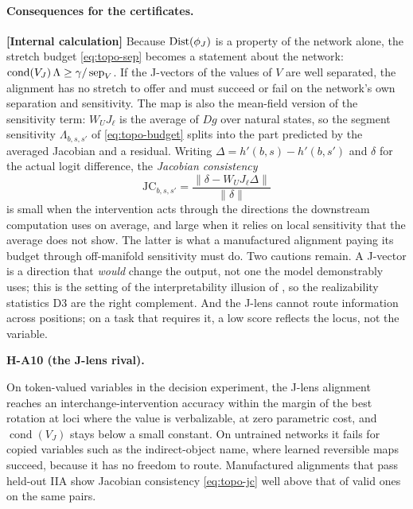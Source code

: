 \documentclass[11pt,a4paper]{article}
\newcommand{\evl}[2]{{\small\bfseries\color{#1}[#2]}}
\newcommand{\LCalc}{\evl{ccalc}{Internal calculation}}
\newenvironment{hypbox}[1]{%
  \def\FrameCommand{{\color{chyp}\vrule width 1.6pt}\hspace{8pt}}%
  \MakeFramed{\advance\hsize-\width\FrameRestore}%
  \noindent\textbf{#1}\par\smallskip\noindent\ignorespaces}{\endMakeFramed}
\begin{document}
\paragraph{Consequences for the certificates.} \LCalc{} Because
$\operatorname{Dist}(\phi_J)$ is a property of the network alone, the stretch budget
\eqref{eq:topo-sep} becomes a statement about the network:
$\operatorname{cond}(V_J)\,\Lambda\ge\gamma/\operatorname{sep}_V$. If the J-vectors of the
values of $V$ are well separated, the alignment has no stretch to offer and
must succeed or fail on the network's own separation and sensitivity. The
map is also the mean-field version of the sensitivity term: $W_UJ_\ell$ is
the average of $Dg$ over natural states, so the segment sensitivity
$\Lambda_{b,s,s'}$ of \eqref{eq:topo-budget} splits into the part predicted
by the averaged Jacobian and a residual. Writing $\Delta=h'(b,s)-h'(b,s')$
and $\delta$ for the actual logit difference, the \emph{Jacobian
consistency}
\begin{equation}
\mathrm{JC}_{b,s,s'}=\frac{\|\delta-W_UJ_\ell\Delta\|}{\|\delta\|}
\label{eq:topo-jc}
\end{equation}
is small when the intervention acts through the directions the downstream
computation uses on average, and large when it relies on local sensitivity
that the average does not show. The latter is what a manufactured alignment
paying its budget through off-manifold sensitivity must do. Two cautions
remain. A J-vector is a direction that \emph{would} change the output, not
one the model demonstrably uses; this is the setting of the interpretability
illusion of \cite{makelov2024}, so the realizability statistics D3 are the
right complement. And the J-lens cannot route information across positions;
on a task that requires it, a low score reflects the locus, not the
variable.

\begin{hypbox}{H-A10 (the J-lens rival).}
On token-valued variables in the decision experiment, the J-lens alignment
reaches an interchange-intervention accuracy within the margin of the best
rotation at loci where the value is verbalizable, at zero parametric cost,
and $\operatorname{cond}(V_J)$ stays below a small constant. On untrained
networks it fails for copied variables such as the indirect-object name,
where learned reversible maps succeed, because it has no freedom to route.
Manufactured alignments that pass held-out IIA show Jacobian consistency
\eqref{eq:topo-jc} well above that of valid ones on the same pairs.
\end{hypbox}
\end{document}
